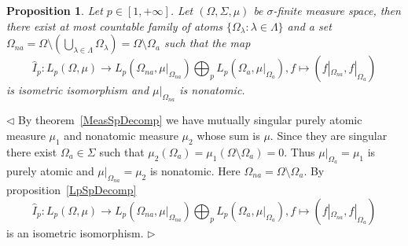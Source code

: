 \documentclass[12pt]{article}
\newtheorem{proposition}[theorem]{Proposition}
\newenvironment{proof}{\par $\triangleleft$}{$\triangleright$}
\begin{document}
\begin{proposition}\label{DescOfLpSpOnMeasSp} Let $p\in[1,+\infty]$. Let
    $(\Omega,\Sigma,\mu)$ be $\sigma$-finite measure space, then
    there exist at most countable family of atoms
    $ \{\Omega_\lambda:\lambda\in\Lambda \}$ and a set
    $\Omega_{na}=\Omega\setminus\left(
        \bigcup_{\lambda\in\Lambda}\Omega_\lambda
        \right)=\Omega\setminus\Omega_{a}$
    such that the map
    $$
        \hat{I}_p:L_p(\Omega,\mu)\to
        L_p(\Omega_{na},\mu|_{\Omega_{na}})
        \bigoplus_{p}L_p(\Omega_{a},\mu|_{\Omega_{a}}),
        f\mapsto (f|_{\Omega_{na}},f|_{\Omega_{a}})
    $$
    is isometric isomorphism and $\mu|_{\Omega_{na}}$ is nonatomic.
\end{proposition}
\begin{proof} By theorem~\ref{MeasSpDecomp} we have mutually singular purely
    atomic measure $\mu_1$ and nonatomic measure $\mu_2$ whose sum is $\mu$.
    Since they are singular there exist $\Omega_a\in\Sigma$ such that
    $\mu_2(\Omega_a)=\mu_1(\Omega\setminus\Omega_a)=0$. Thus
    $\mu|_{\Omega_a}=\mu_1$ is purely atomic and
    $\mu|_{\Omega_{na}}=\mu_2$ is nonatomic. Here
    $\Omega_{na}=\Omega\setminus\Omega_a$. By proposition~\ref{LpSpDecomp}
    $$
        \hat{I}_p:L_p(\Omega,\mu)\to
        L_p(\Omega_{na},\mu|_{\Omega_{na}})
        \bigoplus_{p}L_p(\Omega_{a},\mu|_{\Omega_{a}}),
        f\mapsto (f|_{\Omega_{na}},f|_{\Omega_{a}})
    $$
    is an isometric isomorphism.
\end{proof}
\end{document}
